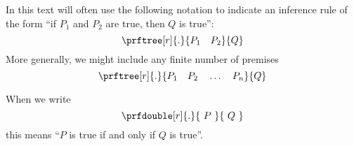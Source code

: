 In this text will often use the following notation to indicate an inference rule of the form ``if $P_1$ and $P_2$ are true, then $Q$ is true'': 
\begin{equation}
\prftree[r]{.}{ 
P_1 \quad P_2
}{
Q
} 
\end{equation}
More generally, we might include any finite number of premises
\begin{equation}
\prftree[r]{.}{ 
P_1 \quad P_2 \quad \dots \quad P_n
}{
Q
} 
\end{equation}

When we write 
\begin{equation}
\prfdouble[r]{.}{ 
\ P \ 
}{
\ Q \ 
} 
\end{equation}
this means ``$P$ is true if and only if $Q$ is true''. 







